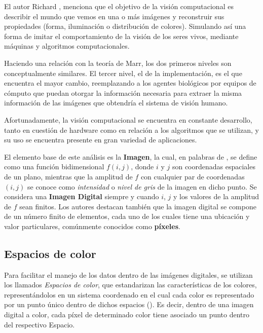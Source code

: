 El autor Richard \cite{szeliski_computer_2022}, menciona que el objetivo de la visión computacional es describir el mundo que vemos en una o más imágenes y reconstruir sus propiedades (forma, iluminación o distribución de colores). Simulando así una forma de imitar el comportamiento de la visión de los seres vivos, mediante máquinas y algoritmos computacionales. 

Haciendo una relación con la teoría de Marr, los dos primeros niveles son conceptualmente similares. El tercer nivel, el de la implementación, es el que encuentra el mayor cambio, reemplazando a los agentes biológicos por equipos de cómputo que puedan otorgar la información necesaria para extraer la misma información de las imágenes que obtendría el sistema de visión humano.


Afortunadamente, la visión computacional se encuentra en constante desarrollo, tanto en cuestión de hardware como en relación a los algoritmos que se utilizan, y su uso se encuentra presente en gran variedad de aplicaciones.


El elemento base de este análisis es la \textbf{Imagen}, la cual, en palabras de \cite{gonzalez_digital_2002}, se define como una función bidimensional $f(i,j)$, donde $i$ y $j$ son coordenadas espaciales de un plano, mientras que la amplitud de $f$ con cualquier par de coordenadas $(i,j)$ se conoce como \textit{intensidad} o \textit{nivel de gris} de la imagen en dicho punto. Se considera una \textbf{Imagen Digital} siempre y cuando $i$, $j$ y los valores de la amplitud de $f$ sean finitos. Los autores destacan también que la imagen digital se compone de un número finito de elementos, cada uno de los cuales tiene una ubicación y valor particulares, comúnmente conocidos como \textbf{píxeles}.

\subsection{Espacios de color}
Para facilitar el manejo de los datos dentro de las imágenes digitales, se utilizan los llamados \textit{Espacios de color}, que estandarizan las características de los colores, representándolos en un sistema coordenado en el cual cada color es representado por un punto único dentro de dichos espacios (\cite{gonzalez_digital_2002}). Es decir, dentro de una imagen digital a color, cada píxel de determinado color tiene asociado un punto dentro del respectivo Espacio.

